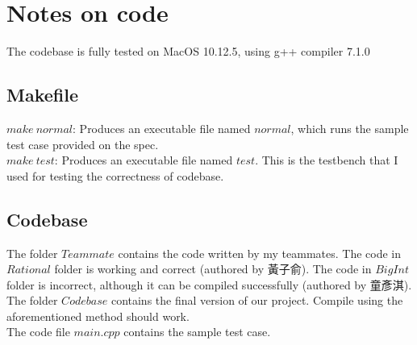 \documentclass[12pt, A4]{article}
\begin{document}
    \section{Notes on code}
    
    The codebase is fully tested on MacOS 10.12.5, using g++ compiler 7.1.0\\
    
    \subsection{Makefile}
    
    $make\ normal$: Produces an executable file named $normal$, which runs the sample test case provided on the spec.\\
    
    $make\ test$: Produces an executable file named $test$. This is the testbench that I used for testing the correctness of codebase.
    
    \subsection{Codebase}
    
    The folder $Teammate$ contains the code written by my teammates. The code in $Rational$ folder is working and correct (authored by 黃子俞). The code in $BigInt$ folder is incorrect, although it can be compiled successfully (authored by 童彥淇).\\
    
    The folder $Codebase$ contains the final version of our project. Compile using the aforementioned method should work. \\
    
    The code file $main.cpp$ contains the sample test case.
	
\end{document}
